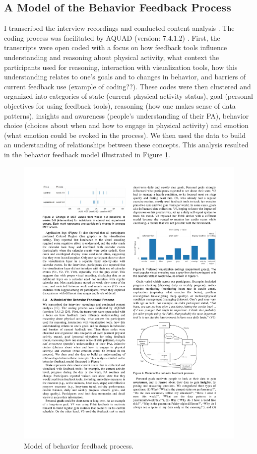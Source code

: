 \documentclass[12pt,oneside]{book}
\begin{document}
\subsection{A Model of the Behavior Feedback Process}
I transcribed the interview recordings and conducted content analysis \cite{miles_qualitative_2013}. The coding process was facilitated by AQUAD (version: 7.4.1.2) \cite{aquad}.  First, the transcripts were open coded with a focus on how feedback tools influence understanding and reasoning about physical activity, what context the participants used for reasoning, interaction with visualization tools, how this understanding relates to one's goals and to changes in behavior, and barriers of current feedback use (example of coding??). These codes were then clustered and organized into categories of state (current physical activity status), goal (personal objectives for using feedback tools), reasoning (how one makes sense of data patterns), insights and awareness (people's understanding of their PA), behavior choice (choices about when and how to engage in physical activity) and emotion (what emotion could be evoked in the process). We then used the data to build an understanding of relationships between these concepts. This analysis resulted in the behavior feedback model illustrated in Figure \ref{fig:model}.

\begin{figure}[h]
\centering
\includegraphics[width=\columnwidth]{figures/model}
\caption{Model of behavior feedback process. }
\label{fig:model}
\end{figure}
\end{document}
